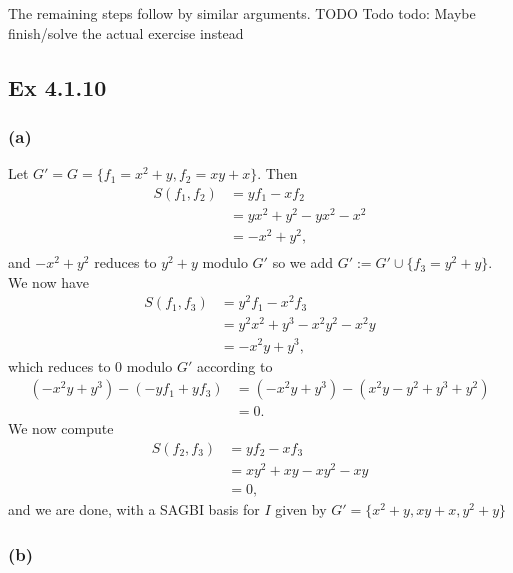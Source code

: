 \documentclass{article}
\theoremstyle{definition}
\begin{document}
The remaining steps follow by similar arguments.
TODO Todo todo: Maybe finish/solve the actual exercise instead

\subsection*{Ex 4.1.10}
\subsubsection*{(a)}

Let $G' = G = \{ f_1 = x^2 + y, f_2 = xy + x \} $.
Then 
\begin{align*}
	S(f_1, f_2)
	&=
	yf_1 - xf_2 \\
	&=
	yx^2 + y^2 - yx^2 - x^2 \\
	&=
	- x^2 + y^2, \\
\end{align*}
and $-x^2 + y^2$ reduces to $y^2 + y$ modulo $G'$
so we add $G' := G' \cup \{ f_3 = y^2 + y\}$.
We now have
\begin{align*}
	S(f_1, f_3)
	&=
	y^2f_1 - x^2f_3 \\
	&=
	y^2x^2 + y^3 - x^2y^2 - x^2y \\
	&=
	-x^2y + y^3,
\end{align*}
which reduces to $0$ modulo $G'$ according to
\begin{align*}
	(-x^2y + y^3) - (-yf_1 + yf_3)
	&=
	(-x^2y + y^3) - (x^2y - y^2 + y^3 + y^2) \\
	&=
	0.
\end{align*}
We now compute
\begin{align*}
	S(f_2, f_3)
	&=
	yf_2 - xf_3 \\
	&=
	xy^2 + xy - xy^2 - xy \\	
	&=
	0,
\end{align*}
and we are done, with a SAGBI basis for $I$ given by $G' = \{ x^2 + y, xy + x,
y^2 + y \} $

\subsubsection*{(b)}
\end{document}
